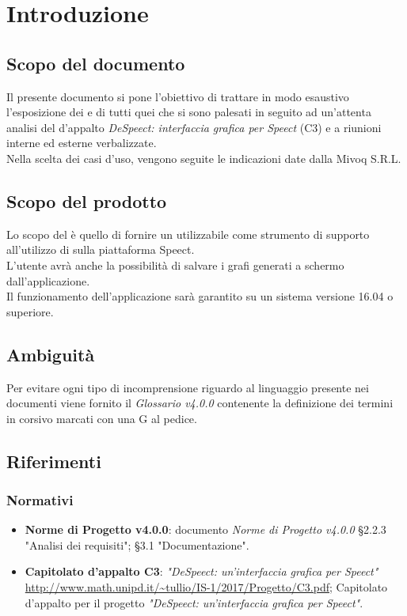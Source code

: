 \documentclass[./AnalisideiRequisiti.tex]{subfiles}
\begin{document}
	
\chapter{Introduzione}
\section{Scopo del documento}
Il presente documento si pone l’obiettivo di trattare in modo esaustivo l’esposizione dei  e di tutti quei  che si sono palesati in seguito ad un’attenta analisi del  d’appalto \textit{DeSpeect: interfaccia grafica per Speect} (C3) e a riunioni interne ed esterne verbalizzate.
\\ \noindent Nella scelta dei casi d'uso, vengono seguite le indicazioni date dalla  Mivoq S.R.L.

\section{Scopo del prodotto}

Lo scopo del  è quello di fornire un  utilizzabile come strumento di supporto all'utilizzo di  sulla piattaforma Speect. 
\\ \noindent L'utente avrà anche la possibilità di salvare i grafi generati a schermo dall'applicazione.
\\ \noindent Il funzionamento dell'applicazione sarà garantito su un sistema  versione 16.04 o superiore.

\section{Ambiguità}
Per evitare ogni tipo di incomprensione riguardo al linguaggio presente nei documenti viene fornito il \textit{Glossario v4.0.0} contenente la definizione dei termini in corsivo marcati con una G al pedice.

\section{Riferimenti}
\subsection*{Normativi}
\begin{itemize}
	\item \textbf{Norme di Progetto v4.0.0}: documento \textit{Norme di Progetto v4.0.0}
	\subitem §2.2.3 "Analisi dei requisiti";
	\subitem §3.1 "Documentazione".
	\item \textbf{Capitolato d'appalto C3}: \textit{"DeSpeect: un'interfaccia grafica per Speect"} \url{http://www.math.unipd.it/~tullio/IS-1/2017/Progetto/C3.pdf};
	\subitem Capitolato d'appalto per il progetto \textit{"DeSpeect: un'interfaccia grafica per Speect"}.

\end{itemize}
\end{document}
